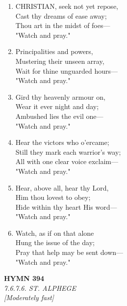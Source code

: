 \begin{enumerate}
    \item CHRISTIAN, seek not yet repose, \\
        Cast thy dreams of ease away; \\
        Thou art in the midst of foes--- \\
        "Watch and pray."

    \item Principalities and powers, \\
        Mustering their unseen array, \\
        Wait for thine unguarded hours--- \\
        "Watch and pray."

    \item Gird thy heavenly armour on, \\
        Wear it ever night and day; \\
        Ambushed lies the evil one--- \\
        "Watch and pray."

    \item Hear the victors who o'ercame; \\
        Still they mark each warrior's way; \\
        All with one clear voice exclaim--- \\
        "Watch and pray."

    \item Hear, above all, hear thy Lord, \\
        Him thou lovest to obey; \\
        Hide within thy heart His word--- \\
        "Watch and pray."

    \item Watch, as if on that alone \\
        Hung the issue of the day; \\
        Pray that help may be sent down--- \\
        "Watch and pray."

\end{enumerate}

\newpage
\begin{center}
    {\Large \textbf{HYMN 394}}
    \\
    \textit{7.6.7.6. ST. ALPHEGE}
    \\
    \textit{\small [Moderately fast]}
\end{center}
\vspace{1em}

